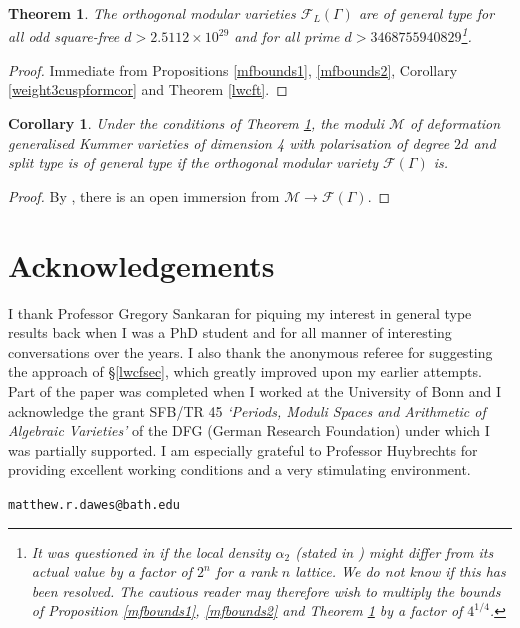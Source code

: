 \documentclass[12pt, a4paper]{article}
\newtheorem{thm}{Theorem}[section]
\newtheorem{cor}{Corollary}[section]
\newcommand{\fc}{\mathcal{F}}
\newcommand{\mc}{\mathcal{M}}
\begin{document}
  \begin{thm}\label{gtthm}
    The orthogonal modular varieties $\fc_L(\Gamma)$ are of general type for all odd square-free $d>2.5112 \times 10^{29}$ and for all prime $d>3468755940829$\footnote{It was questioned in \cite{ConwaySloaneMass} if the local density $\alpha_2$ \cite{Watson} (stated in \cite[Theorem 5.6.3]{Kitaoka}) \emph{might} differ from its actual value by a factor of $2^n$ for a rank $n$ lattice.
      We do not know if this has been resolved.
      The cautious reader may therefore wish to multiply the bounds of Proposition \ref{mfbounds1}, \ref{mfbounds2} and Theorem \ref{gtthm} by a factor of $4^{1/4}$.
}.
  \end{thm}
  \begin{proof}
    Immediate from Propositions \ref{mfbounds1}, \ref{mfbounds2}, Corollary  \ref{weight3cuspformcor} and Theorem \ref{lwcft}.
  \end{proof}
    \begin{cor}
    Under the conditions of Theorem \ref{gtthm}, the moduli $\mc$ of deformation generalised Kummer varieties of dimension 4 with polarisation of degree $2d$ and split type is of general type if the orthogonal modular variety $\fc(\Gamma)$ is.
  \end{cor}
  \begin{proof}
    By \cite[Theorem 3.10]{Handbook}, there is an open immersion from $\mc \rightarrow \fc(\Gamma)$.
\end{proof}
 \section{Acknowledgements}
I thank Professor Gregory Sankaran for piquing my interest in general type results back when I was a PhD student and for all manner of interesting conversations over the years.
I also thank the anonymous referee for suggesting the approach of \S\ref{lwcfsec}, which greatly improved upon my earlier attempts.
Part of the paper was completed when I worked at the University of Bonn and I acknowledge the grant SFB/TR 45 \emph{`Periods, Moduli Spaces and Arithmetic of Algebraic Varieties'} of the DFG (German Research Foundation) under which I was partially supported.
I am especially grateful to Professor Huybrechts for providing  excellent working conditions and a very stimulating environment. 

 
{}
\noindent \texttt{matthew.r.dawes@bath.edu}
\end{document}
